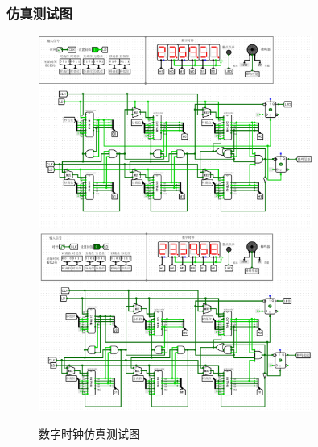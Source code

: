 \documentclass{article}
\begin{document}
    \subsubsection{仿真测试图}
    \begin{figure}[H]
    \centering
    \includegraphics[width=0.8\textwidth]{2.5.1.png}
    \includegraphics[width=0.8\textwidth]{2.5.2.png}
    \caption{数字时钟仿真测试图}
    \end{figure}
    
\end{document}
